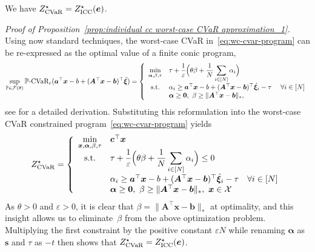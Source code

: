 \documentclass[nonblindrev]{informs2017}
\newcommand{\bmt}[1]{\tilde{\bm{#1}}}
\newcommand{\bmh}[1]{\hat{\bm{#1}}}
\newcommand{\1}[1]{\mathds{1}{\left(#1\right)}}
\begin{document}
\begin{proposition}\label{prop:individual cc worst-case CVaR approximation_1}
	We have $Z^\star_{\rm CVaR}= Z^\star_{\rm ICC}(\bm e)$.
\end{proposition}

\noindent \emph{Proof of Proposition~\ref{prop:individual cc worst-case CVaR approximation_1}.} $\;$
Using now standard techniques, the worst-case CVaR in~\eqref{eq:wc-cvar-program} can be re-expressed as the optimal value of a finite conic program,
$$
\sup_{\mathbb{P} \in \mathcal{F}(\theta)} \mathbb{P}\text{-CVaR}_{\varepsilon}(\bm{a}^\top\bm{x} - b+ (\bm{A}^\top\bm{x}-\bm{b})^\top\bmt{\xi}) = \left\{\begin{array}{cll}
\displaystyle{\min_{\bm \alpha, \beta,\tau}} & \displaystyle \tau + \dfrac{1}{\varepsilon} \Big(\theta \beta + \dfrac{1}{N} \sum_{i \in [N]} \alpha_i\Big)  \\
{\rm s.t.} & \alpha_i  \geq \bm{a}^\top\bm{x} -b + (\bm{A}^\top\bm{x}-\bm{b})^\top\bmh{\xi}_i -\tau &~\forall i \in [N] \\
& \bm{\alpha} \geq \bm{0}, ~ \beta \geq \|\bm{A}^\top\bm{x} - \bm{b}\|_*, 
\end{array}\right.
$$
see \citet[\S~5.1 and \S~7.1]{Esfahani_Kuhn_2017} for a detailed derivation. Substituting this reformulation into the worst-case CVaR constrained program~\eqref{eq:wc-cvar-program} yields
\[
Z^\star_{\rm CVaR}=\left\{ \begin{array}{cl}
\displaystyle \min_{\bm{x},\bm \alpha, \beta,\tau} & \bm{c}^\top\bm{x} \\
{\rm s.t.} & \tau + \dfrac{1}{\varepsilon} \Big(\theta \beta + \dfrac{1}{N} \displaystyle\sum_{i \in [N]} \alpha_i\Big) \leq 0\\
& \alpha_i  \geq \bm{a}^\top\bm{x} -b + (\bm{A}^\top\bm{x}-\bm{b})^\top\bmh{\xi}_i -\tau \quad\forall i \in [N] \\
& \bm{\alpha} \geq \bm{0}, ~ \beta \geq \|\bm{A}^\top\bm{x} - \bm{b}\|_*,~ \bm{x} \in \mathcal{X}
\end{array}\right.
\]
As $\theta > 0$ and $\varepsilon>0$, it is clear that $\beta = \|\bm{A}^\top\bm{x}-\bm{b}\|_*$ at optimality, and this insight allows us to eliminate~$\beta$ from the above optimization problem. Multiplying the first constraint by the positive constant $\varepsilon N$ while renaming $\bm \alpha$ as $\bm s$ and $\tau$ as $-t$ then shows that $Z^\star_{\rm CVaR}= Z^\star_{\rm ICC}(\bm e)$.
\hfill \Halmos
\endproof
\end{document}
